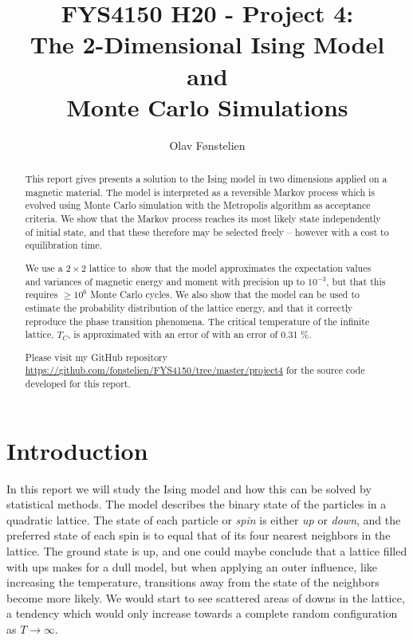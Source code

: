 \documentclass[]{article}
\title{FYS4150 H20 - Project 4:\\The 2-Dimensional Ising Model and \\Monte Carlo Simulations}
\author{Olav Fønstelien}
\begin{document}
\maketitle

\begin{abstract}

This report gives presents a solution to the Ising model in two dimensions applied on a magnetic material. The model is interpreted as a reversible Markov process which is evolved using Monte Carlo simulation with the Metropolis algorithm as acceptance criteria. We show that the Markov process reaches its most likely state independently of initial state, and that these therefore may be selected freely -- however with a cost to equilibration time.

We use a $2 \times 2$ lattice to show that the model approximates the expectation values and variances of magnetic energy and moment with precision up to $10^{-3}$, but that this requires $\ge 10^6$ Monte Carlo cycles. We also show that the model can be used to estimate the probability distribution of the lattice energy, and that it correctly reproduce the phase transition phenomena. The critical temperature of the infinite lattice, $T_C$, is approximated with an error of with an error of 0.31 \%.

Please visit my GitHub repository \url{https://github.com/fonstelien/FYS4150/tree/master/project4} for the source code developed for this report.

\end{abstract}

\section{Introduction} \label{sec:intro}

In this report we will study the Ising model and how this can be solved by statistical methods. The model describes the binary state of the particles in a quadratic lattice. The state of each particle or \textit{spin} is either \textit{up} or \textit{down}, and the preferred state of each spin is to equal that of its four nearest neighbors in the lattice. The ground state is up, and one could maybe conclude that a lattice filled with ups makes for a dull model, but when applying an outer influence, like increasing the temperature, transitions away from the state of the neighbors become more likely. We would start to see scattered areas of downs in the lattice, a tendency which would only increase towards a complete random configuration as $T \rightarrow \infty$.
\end{document}
